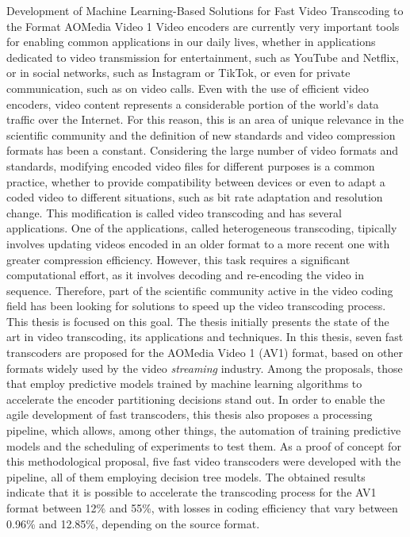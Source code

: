 \documentclass[tese,capa]{texufpel}
\begin{document}
\begin{englishabstract}{Development of Machine Learning-Based Solutions for Fast Video Transcoding to the Format AOMedia Video 1}
Video encoders are currently very important tools for enabling common applications in our daily lives, whether in applications dedicated to video transmission for entertainment, such as YouTube and Netflix, or in social networks, such as Instagram or TikTok, or even for private communication, such as on video calls. Even with the use of efficient video encoders, video content represents a considerable portion of the world's data traffic over the Internet. For this reason, this is an area of unique relevance in the scientific community and the definition of new standards and video compression formats has been a constant. Considering the large number of video formats and standards, modifying encoded video files for different purposes is a common practice, whether to provide compatibility between devices or even to adapt a coded video to different situations, such as bit rate adaptation and resolution change. This modification is called video transcoding and has several applications. One of the applications, called heterogeneous transcoding, tipically involves updating videos encoded in an older format to a more recent one with greater compression efficiency. However, this task requires a significant computational effort, as it involves decoding and re-encoding the video in sequence. Therefore, part of the scientific community active in the video coding field has been looking for solutions to speed up the video transcoding process. This thesis is focused on this goal. The thesis initially presents the state of the art in video transcoding, its applications and techniques. In this thesis, seven fast transcoders are proposed for the AOMedia Video 1 (AV1) format, based on other formats widely used by the video \textit{streaming} industry. Among the proposals, those that employ predictive models trained by machine learning algorithms to accelerate the encoder partitioning decisions stand out. In order to enable the agile development of fast transcoders, this thesis also proposes a processing pipeline, which allows, among other things, the automation of training predictive models and the scheduling of experiments to test them. As a proof of concept for this methodological proposal, five fast video transcoders were developed with the pipeline, all of them employing decision tree models. The obtained results indicate that it is possible to accelerate the transcoding process for the AV1 format between 12\% and 55\%, with losses in coding efficiency that vary between 0.96\% and 12.85\%, depending on the source format.
\end{englishabstract}
\end{document}
